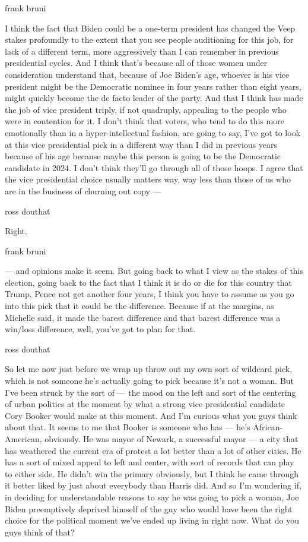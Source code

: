frank bruni

I think the fact that Biden could be a one-term president has changed
the Veep stakes profoundly to the extent that you see people auditioning
for this job, for lack of a different term, more aggressively than I can
remember in previous presidential cycles. And I think that's because all
of those women under consideration understand that, because of Joe
Biden's age, whoever is his vice president might be the Democratic
nominee in four years rather than eight years, might quickly become the
de facto leader of the party. And that I think has made the job of vice
president triply, if not quadruply, appealing to the people who were in
contention for it. I don't think that voters, who tend to do this more
emotionally than in a hyper-intellectual fashion, are going to say, I've
got to look at this vice presidential pick in a different way than I did
in previous years because of his age because maybe this person is going
to be the Democratic candidate in 2024. I don't think they'll go through
all of those hoops. I agree that the vice presidential choice usually
matters way, way less than those of us who are in the business of
churning out copy ---

ross douthat

Right.

frank bruni

--- and opinions make it seem. But going back to what I view as the
stakes of this election, going back to the fact that I think it is do or
die for this country that Trump, Pence not get another four years, I
think you have to assume as you go into this pick that it could be the
difference. Because if at the margins, as Michelle said, it made the
barest difference and that barest difference was a win/loss difference,
well, you've got to plan for that.

ross douthat

So let me now just before we wrap up throw out my own sort of wildcard
pick, which is not someone he's actually going to pick because it's not
a woman. But I've been struck by the sort of --- the mood on the left
and sort of the centering of urban politics at the moment by what a
strong vice presidential candidate Cory Booker would make at this
moment. And I'm curious what you guys think about that. It seems to me
that Booker is someone who has --- he's African-American, obviously. He
was mayor of Newark, a successful mayor --- a city that has weathered
the current era of protest a lot better than a lot of other cities. He
has a sort of mixed appeal to left and center, with sort of records that
can play to either side. He didn't win the primary obviously, but I
think he came through it better liked by just about everybody than
Harris did. And so I'm wondering if, in deciding for understandable
reasons to say he was going to pick a woman, Joe Biden preemptively
deprived himself of the guy who would have been the right choice for the
political moment we've ended up living in right now. What do you guys
think of that?

